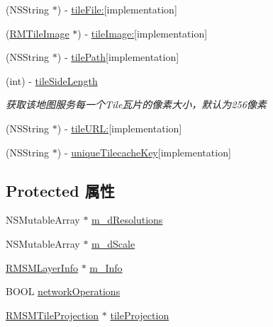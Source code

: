 \begin{DoxyCompactItemize}
(N\-S\-String $\ast$) -\/ \hyperlink{interface_r_m_s_m_tile_source_a3fb529e7752539b4eeabb32abadbd63a}{tile\-File\-:}{\ttfamily  \mbox{[}implementation\mbox{]}}
\item 
(\hyperlink{interface_r_m_tile_image}{R\-M\-Tile\-Image} $\ast$) -\/ \hyperlink{interface_r_m_s_m_tile_source_afe0b4e6f2fb9b6d62ad4b9ed2e3cae0c}{tile\-Image\-:}{\ttfamily  \mbox{[}implementation\mbox{]}}
\item 
(N\-S\-String $\ast$) -\/ \hyperlink{interface_r_m_s_m_tile_source_a6fa705790663ec490472a33c2f883441}{tile\-Path}{\ttfamily  \mbox{[}implementation\mbox{]}}
\item 
(int) -\/ \hyperlink{interface_r_m_s_m_tile_source_ad875f4b697985403044dc07828bfd214}{tile\-Side\-Length}
\begin{DoxyCompactList}\small\item\em 获取该地图服务每一个\-Tile瓦片的像素大小，默认为256像素 \end{DoxyCompactList}\item 
(N\-S\-String $\ast$) -\/ \hyperlink{interface_r_m_s_m_tile_source_a5f4efa41c7b2d6bf69ebaf8745d517bc}{tile\-U\-R\-L\-:}{\ttfamily  \mbox{[}implementation\mbox{]}}
\item 
(N\-S\-String $\ast$) -\/ \hyperlink{interface_r_m_s_m_tile_source_aa8ddf038d066c3c34a16ef0818afc061}{unique\-Tilecache\-Key}{\ttfamily  \mbox{[}implementation\mbox{]}}
\end{DoxyCompactItemize}
\subsection*{Protected 属性}
\begin{DoxyCompactItemize}
\item 
N\-S\-Mutable\-Array $\ast$ \hyperlink{interface_r_m_s_m_tile_source_a68bd5cd0a6b8a8161ca0b9dceee8eb17}{m\-\_\-d\-Resolutions}
\item 
N\-S\-Mutable\-Array $\ast$ \hyperlink{interface_r_m_s_m_tile_source_a6587840e4cce389c96e06aeceac54903}{m\-\_\-d\-Scale}
\item 
\hyperlink{interface_r_m_s_m_layer_info}{R\-M\-S\-M\-Layer\-Info} $\ast$ \hyperlink{interface_r_m_s_m_tile_source_a4af8afb20d814e6560a7ad5f06842121}{m\-\_\-\-Info}
\item 
B\-O\-O\-L \hyperlink{interface_r_m_s_m_tile_source_adfde0811f0bd0c2f6ac822c67acc2e30}{network\-Operations}
\item 
\hyperlink{interface_r_m_s_m_tile_projection}{R\-M\-S\-M\-Tile\-Projection} $\ast$ \hyperlink{interface_r_m_s_m_tile_source_a317fdb087c2cbf6a59ce8e19048ce2c4}{tile\-Projection}
\end{DoxyCompactItemize}


